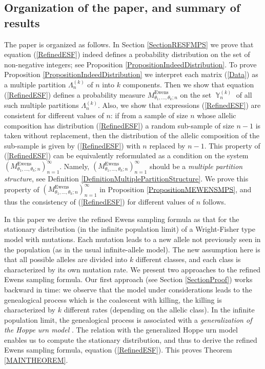 \documentclass[12pt]{amsart}
\theoremstyle{definition}
\numberwithin{equation}{section}
\DeclareMathOperator{\Y}{\mathbb{Y}}
\DeclareMathOperator{\Ewens}{Ewens}
\begin{document}
\subsection{Organization of the paper, and summary of results}
The paper is organized as follows. In Section \ref{SectionRESFMPS}
we prove that equation (\ref{RefinedESF}) indeed defines a probability distribution on the set of non-negative integers; see Proposition
\ref{PropositionIndeedDistribution}. To prove Proposition \ref{PropositionIndeedDistribution} we interpret each matrix (\ref{Data}) as a multiple partition $\Lambda_n^{(k)}$  of $n$
into $k$ components. Then we show that equation (\ref{RefinedESF})  defines a probability measure
$M_{\theta_1,\ldots,\theta_k; n}^{\Ewens}$ on the set $\Y_n^{(k)}$
of all such multiple partitions $\Lambda_n^{(k)}$. Also, we show that
expressions (\ref{RefinedESF}) are consistent for different values of $n$: if from a sample of size $n$ whose allelic composition has distribution (\ref{RefinedESF}) a random sub-sample of size $n-1$ is
taken without replacement, then the distribution of the allelic composition of the sub-sample is given by (\ref{RefinedESF})
with $n$ replaced by $n-1$. This property of (\ref{RefinedESF})
can be equivalently reformulated as a condition on the system
$\left(M_{\theta_1,\ldots,\theta_k;n}^{\Ewens}\right)_{n=1}^{\infty}$.
Namely, $\left(M_{\theta_1,\ldots,\theta_k;n}^{\Ewens}\right)_{n=1}^{\infty}$
should be a \textit{multiple partition structure}, see Definition \ref{DefinitionMultiplePartitionStructure}. We prove this property
of $\left(M_{\theta_1,\ldots,\theta_k;n}^{\Ewens}\right)_{n=1}^{\infty}$
in Proposition \ref{PropositionMEWENSMPS}, and thus the consistency
of (\ref{RefinedESF}) for different values of $n$ follows.

In this paper we derive the refined Ewens sampling formula as that for the stationary distribution (in the infinite population limit)
of a Wright-Fisher type model with mutations. Each mutation leads to a new allele not previously seen in the population (as in the usual infinite-allele model). The new assumption here is that all possible alleles are divided into $k$ different classes, and each class is characterized by its own mutation rate. We present two approaches to the refined Ewens sampling formula.
Our first approach (see Section \ref{SectionProof}) works backward in time: we observe that the model under considerations leads to the genealogical process which is the coalescent with killing, the killing is characterized by $k$ different rates (depending on the allelic class).
In the infinite population limit, the genealogical process is associated with a \textit{generalization of the Hoppe urn model} \cite{Hoppe1,Hoppe2}. The relation with
the generalized Hoppe urn model enables us to compute the stationary distribution, and thus to derive the refined Ewens sampling formula,
equation (\ref{RefinedESF}). This proves Theorem \ref{MAINTHEOREM}.
\end{document}
